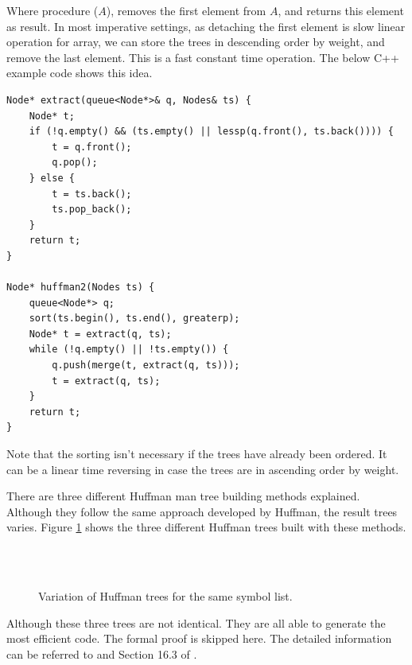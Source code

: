 \documentclass[UTF8]{article}
\begin{document}
\begin{algorithmic}[1]
    \State \Return {}
  \Else
    \State \Return {}
  \EndIf
\EndFunction
\end{algorithmic}

Where procedure ($A$), removes the first element from $A$,
and returns this element as result. In most imperative settings, as detaching
the first element is slow linear operation for array, we can store the trees
in descending order by weight, and remove the last element. This is a fast
constant time operation. The below C++ example code shows this idea.

\lstset{language=C++}
\begin{lstlisting}
Node* extract(queue<Node*>& q, Nodes& ts) {
    Node* t;
    if (!q.empty() && (ts.empty() || lessp(q.front(), ts.back()))) {
        t = q.front();
        q.pop();
    } else {
        t = ts.back();
        ts.pop_back();
    }
    return t;
}

Node* huffman2(Nodes ts) {
    queue<Node*> q;
    sort(ts.begin(), ts.end(), greaterp);
    Node* t = extract(q, ts);
    while (!q.empty() || !ts.empty()) {
        q.push(merge(t, extract(q, ts)));
        t = extract(q, ts);
    }
    return t;
}
\end{lstlisting}

Note that the sorting isn't necessary if the trees have already been ordered.
It can be a linear time reversing in case the trees are in ascending order by
weight.

There are three different Huffman man tree building methods explained. Although
they follow the same approach developed by Huffman, the result trees varies.
Figure \ref{fig:huffman-vars} shows the three different Huffman trees built
with these methods.

\begin{figure}[htbp]
 \centering
  \\
  \\
 \caption{Variation of Huffman trees for the same symbol list.}
 \label{fig:huffman-vars}
\end{figure}

Although these three trees are not identical. They are all able to generate the
most efficient code. The formal proof is skipped here. The detailed information
can be referred to \cite{Huffman} and Section 16.3 of \cite{CLRS}.
\end{document}
